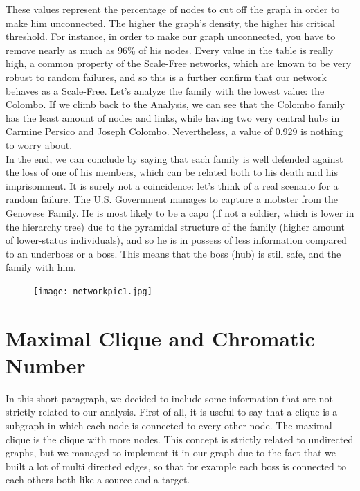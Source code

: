 \documentclass{article}
\begin{document}
\noindent
These values represent the percentage of nodes to cut off the graph in order to make him unconnected. The higher the graph's density, the higher his critical threshold. For instance, in order to make our graph unconnected, you have to remove nearly as much as 96\% of his nodes. Every value in the table is really high, a common property of the Scale-Free networks, which are known to be very robust to random failures, and so this is a further confirm that our network behaves as a Scale-Free. Let's analyze the family with the lowest value: the Colombo. If we climb back to the \hyperlink{Analysis}{Analysis}, we can see that the Colombo family has the least amount of nodes and links, while having two very central hubs in Carmine Persico and Joseph Colombo. Nevertheless, a value of 0.929 is nothing to worry about.\\
In the end, we can conclude by saying that each family is well defended against the loss of one of his members, which can be related both to his death and his imprisonment. It is surely not a coincidence: let's think of a real scenario for a random failure. The U.S. Government manages to capture a mobster from the Genovese Family. He is most likely to be a capo (if not a soldier, which is lower in the hierarchy tree) due to the pyramidal structure of the family (higher amount of lower-status individuals), and so he is in possess of less information compared to an underboss or a boss. This means that the boss (hub) is still safe, and the family with him.
\newpage



\pagecolor{white}



\begin{figure}[t!]
\vspace{-250pt}
\centering
\texttt{[image: networkpic1.jpg]}
\advance\leftskip-3.52cm
\end{figure}



\section{\textcolor{Paragrafi}{Maximal Clique and Chromatic Number}}
In this short paragraph, we decided to include some information that are not strictly related to our analysis. First of all, it is useful to say that a clique is a subgraph in which each node is connected to every other node. The maximal clique is the clique with more nodes. This concept is strictly related to undirected graphs, but we managed to implement it in our graph due to the fact that we built a lot of multi directed edges, so that for example each boss is connected to each others both like a source and a target.
\end{document}
